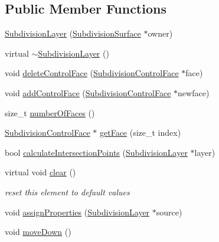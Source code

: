 \subsection*{Public Member Functions}
\begin{DoxyCompactItemize}
\item 
\hyperlink{classShipCADGeometry_1_1SubdivisionLayer_a788864a40265b764b8d97d9a9cbbbd13}{Subdivision\-Layer} (\hyperlink{classShipCADGeometry_1_1SubdivisionSurface}{Subdivision\-Surface} $\ast$owner)
\item 
virtual \hyperlink{classShipCADGeometry_1_1SubdivisionLayer_a4e852a07f46e57f28ffedd4a68c2f4c4}{$\sim$\-Subdivision\-Layer} ()
\item 
void \hyperlink{classShipCADGeometry_1_1SubdivisionLayer_a45b3af65b8b11dd2bf566a454bc125bd}{delete\-Control\-Face} (\hyperlink{classShipCADGeometry_1_1SubdivisionControlFace}{Subdivision\-Control\-Face} $\ast$face)
\item 
void \hyperlink{classShipCADGeometry_1_1SubdivisionLayer_a3c966ebc7e2c1f516f2329324d5658e2}{add\-Control\-Face} (\hyperlink{classShipCADGeometry_1_1SubdivisionControlFace}{Subdivision\-Control\-Face} $\ast$newface)
\item 
size\-\_\-t \hyperlink{classShipCADGeometry_1_1SubdivisionLayer_ac25e800b3f77d61413272a06cb616813}{number\-Of\-Faces} ()
\item 
\hyperlink{classShipCADGeometry_1_1SubdivisionControlFace}{Subdivision\-Control\-Face} $\ast$ \hyperlink{classShipCADGeometry_1_1SubdivisionLayer_a2e1538a000268fe5f56bf2bea4973c23}{get\-Face} (size\-\_\-t index)
\item 
bool \hyperlink{classShipCADGeometry_1_1SubdivisionLayer_ab2d11ebf60ad6edd818eb0c42971946c}{calculate\-Intersection\-Points} (\hyperlink{classShipCADGeometry_1_1SubdivisionLayer}{Subdivision\-Layer} $\ast$layer)
\item 
virtual void \hyperlink{classShipCADGeometry_1_1SubdivisionLayer_a7046d17ba87dd5ce7399f22ae327fc6e}{clear} ()
\begin{DoxyCompactList}\small\item\em reset this element to default values \end{DoxyCompactList}\item 
void \hyperlink{classShipCADGeometry_1_1SubdivisionLayer_a319ae070f596e92307671cda0a607887}{assign\-Properties} (\hyperlink{classShipCADGeometry_1_1SubdivisionLayer}{Subdivision\-Layer} $\ast$source)
\item 
void \hyperlink{classShipCADGeometry_1_1SubdivisionLayer_a75d5f29031d9c93f291d370c79614e87}{move\-Down} ()

\end{DoxyCompactItemize}
